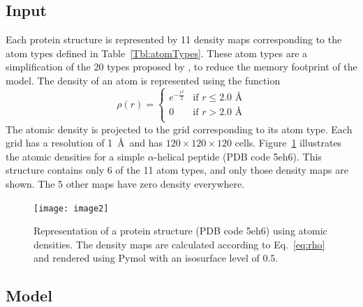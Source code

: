 \documentclass{bioinfo}
\begin{document}
\subsection{Input}

Each protein structure is represented by 11 density maps corresponding
to the atom types defined in Table~\ref{Tbl:atomTypes}. These atom
types are a simplification of the 20 types proposed by \citet{huang2006iterative, huang2008iterative}, to reduce the
memory footprint of the model.
The density of an atom is represented using the function
\begin{equation}
\rho(r) =  \begin{cases}
               e^{-\frac{r^2}{2}}&\text{if } r\leq 2.0\text{ \AA} \\
               0                 &\text{if } r>2.0\text{ \AA} \\
            \end{cases}
\label{eq:rho}
\end{equation}
The atomic density is projected to the grid corresponding to its atom
type. Each grid has a resolution of 1~\AA\ and has $120\times
120\times 120$ cells.
%
Figure~\ref{Fig:atomic_densities} illustrates the atomic densities for
a simple $\alpha$-helical peptide (PDB code 5eh6). This structure
contains only 6 of the 11 atom types, and only those density maps are
shown. The 5 other maps have zero density everywhere.

\begin{figure}[t]
    \centerline{\texttt{[image: image2]}}
%
    \vspace{-10pt}
    \caption{Representation of a protein structure (PDB code 5eh6)
    using atomic densities. The density maps are calculated according
    to Eq.~\ref{eq:rho} and rendered using Pymol \citep{PyMOL} with an
    isosurface level of $0.5$.}
%
    \label{Fig:atomic_densities}
\end{figure}


\subsection{Model}
\end{document}
